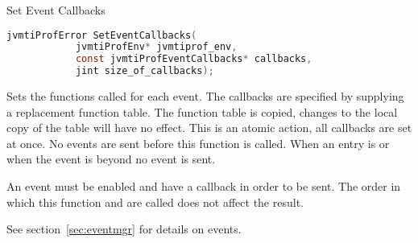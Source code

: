 \begin{apidef}{Set Event Callbacks}
\begin{lstlisting}[language=C]
jvmtiProfError SetEventCallbacks(
            jvmtiProfEnv* jvmtiprof_env,
            const jvmtiProfEventCallbacks* callbacks,
            jint size_of_callbacks);
\end{lstlisting}

\begin{apidesc}
Sets the functions called for each event. The callbacks are specified by supplying a replacement function table. The function table is copied, changes to the local copy of the table will have no effect. This is an atomic action, all callbacks are set at once. No events are sent before this function is called. When an entry is  or when the event is beyond  no event is sent.

\medskip
An event must be enabled and have a callback in order to be sent. The order in which this function and  are called does not affect the result. 

\medskip
See section~\ref{sec:eventmgr} for details on events.
\end{apidesc}

\begin{apiphase}
\apiphaseonloadlive
\end{apiphase}

\begin{apicap}
\apicaprequired
\end{apicap}

\begin{apiparam}
\end{apiparam}

\begin{apierror}
\end{apierror}
\end{apidef}
\iffalse

